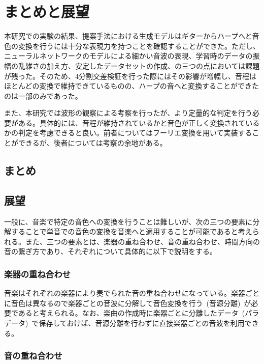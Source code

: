 \chapter{まとめと展望}

本研究での実験の結果、提案手法における生成モデルはギターからハープへと音色の変換を行うには十分な表現力を持つことを確認することができた。ただし、ニューラルネットワークのモデルによる細かい音波の表現、学習時のデータの振幅の乱雑さの加え方、安定したデータセットの作成、の三つの点においては課題が残った。そのため、4分割交差検証を行った際にはその影響が増幅し、音程はほとんどの変換で維持できているものの、ハープの音へと変換することができたのは一部のみであった。

また、本研究では波形の観察による考察を行ったが、より定量的な判定を行う必要がある。具体的には、音程が維持されているかと音色が正しく変換されているかの判定を考慮できると良い。前者についてはフーリエ変換を用いて実装することができるが、後者については考察の余地がある。

\section{まとめ}


\section{展望}

一般に、音楽で特定の音色への変換を行うことは難しいが、次の三つの要素に分解することで単音での音色の変換を音楽へと適用することが可能であると考えられる。また、三つの要素とは、楽器の重ね合わせ、音の重ね合わせ、時間方向の音の繋ぎ方であり、それぞれについて具体的に以下で説明をする。

\subsection{楽器の重ね合わせ}
    
音楽はそれぞれの楽器により奏でられた音の重ね合わせになっている。楽器ごとに音色は異なるので楽器ごとの音波に分解して音色変換を行う~(音源分離)~が必要であると考えられる。なお、楽曲の作成時に楽器ごとに分離したデータ~(パラデータ)~で保存しておけば、音源分離を行わずに直接楽器ごとの音波を利用できる。

\subsection{音の重ね合わせ}

